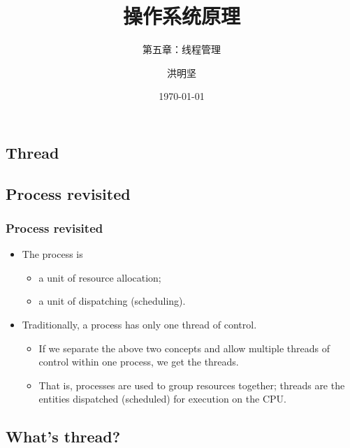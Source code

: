\documentclass[CJKutf8,xcolor=pdftex,dvipsnames,table]{beamer}
\begin{document}
\begin{CJK*}{UTF8}{song}

  \title{ 操作系统原理}
  \subtitle{ 第五章：线程管理}
	\author{ 洪明坚}
  \date{\today}


  \frame{\titlepage}


  \section{Thread}

  \subsection{Process revisited}

  \begin{frame}
  \frametitle{Process revisited} \pause
  \begin{itemize}
  \item{The process is} \pause
    \begin{itemize}
    \item{a unit of resource allocation;} \pause
    \item{a unit of dispatching (scheduling).} \pause
    \end{itemize}
  \item{Traditionally, a process has only one thread of control.} \pause
    \begin{itemize}
    \item{If we separate the above two concepts and allow multiple threads of control within one process, we get the threads.} \pause
    \item{That is, processes are used to group resources together; \pause threads are the entities dispatched (scheduled) for execution on the CPU.}
    \end{itemize}
  \end{itemize}
  \end{frame}

  \subsection{What's thread?}


\end{CJK*}
\end{document}
